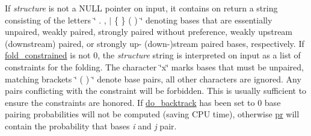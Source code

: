 If {\itshape structure} is not a N\+U\+LL pointer on input, it contains on return a string consisting of the letters \char`\"{} . , $\vert$ \{ \} ( ) \char`\"{} denoting bases that are essentially unpaired, weakly paired, strongly paired without preference, weakly upstream (downstream) paired, or strongly up-\/ (down-\/)stream paired bases, respectively. If \mbox{\hyperlink{fold__vars_8h_a0afc287c2464866d94858c39175154af}{fold\+\_\+constrained}} is not 0, the {\itshape structure} string is interpreted on input as a list of constraints for the folding. The character \char`\"{}x\char`\"{} marks bases that must be unpaired, matching brackets \char`\"{} ( ) \char`\"{} denote base pairs, all other characters are ignored. Any pairs conflicting with the constraint will be forbidden. This is usually sufficient to ensure the constraints are honored. If \mbox{\hyperlink{group__model__details_gad512b5dd4dbec60faccfe137bb474489}{do\+\_\+backtrack}} has been set to 0 base pairing probabilities will not be computed (saving C\+PU time), otherwise \mbox{\hyperlink{fold__vars_8h_ac98ec419070aee6831b44e5c700f090f}{pr}} will contain the probability that bases {\itshape i} and {\itshape j} pair.

